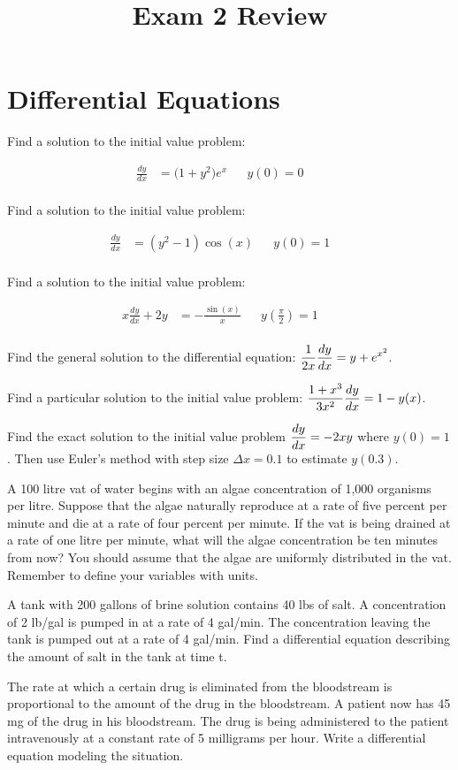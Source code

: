 \documentclass[paper=letter, 11pt]{article}
\title{Exam 2 Review}
\subtitle{}
\newcommand{\IVProb}[1]{
	\begin{minipage}{0.5\textwidth}
		\Prob Find a solution to the initial value problem:
	\end{minipage}%
	\begin{minipage}{0.5\textwidth}
		\begin{align*}
			#1
		\end{align*}
	\end{minipage}
}
\begin{document}
\maketitle

\section*{Differential Equations}

\IVProb{
	\frac{dy}{dx} &= \Big(1 + y^2\Big)e^x && y(0) = 0 && \\
}\vfill

\IVProb{
	\frac{dy}{dx} &=  \left(y^2 - 1\right)\cos(x) && y(0) = 1 && \\
}\vfill


\IVProb{
	x\frac{dy}{dx} + 2y &= -\frac{\sin(x)}{x}  && y\left(\frac{\pi}{2}\right) = 1 && \\
}\vfill

\newpage

\Prob Find the general solution to the differential equation: \quad $\displaystyle \frac{1}{2x}\frac{dy}{dx} = y + e^{x^2}$.\vfill

\Prob Find a particular solution to the initial value problem: \quad $\displaystyle \frac{1 + x^3}{3x^2}\frac{dy}{dx} = 1 - y(x)$.\vfill

\Prob Find the exact solution to the initial value problem $\displaystyle\frac{dy}{dx} = -2xy$ where $y(0) = 1$.  Then use Euler's method with step size $\Delta x = 0.1$ to estimate $y(0.3)$.\vfill

\newpage

\Prob A 100 litre vat of water begins with an algae concentration of 1,000 organisms per litre. 
Suppose that the algae naturally reproduce at a rate of five percent per minute and die
at a rate of four percent per minute. If the vat is being drained at a rate of one litre
per minute, what will the algae concentration be ten minutes from now? You should
assume that the algae are uniformly distributed in the vat. Remember to define your variables with units.\vfill

\Prob A tank with 200 gallons of brine solution contains 40 lbs of salt. A concentration of
2 lb/gal is pumped in at a rate of 4 gal/min. The concentration leaving the tank is
pumped out at a rate of 4 gal/min. Find a differential equation describing the amount
of salt in the tank at time t.\vfill

\Prob The rate at which a certain drug is eliminated from the bloodstream is proportional to
the amount of the drug in the bloodstream. A patient now has 45 mg of the drug in his
bloodstream. The drug is being administered to the patient intravenously at a constant
rate of 5 milligrams per hour. Write a differential equation modeling the situation.\vfill
\end{document}
